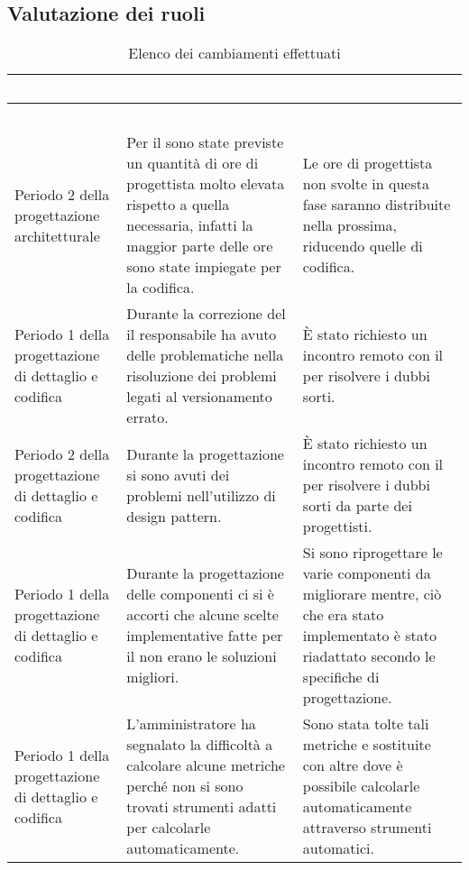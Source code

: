 \subsection{Valutazione dei ruoli}

{
	\renewcommand{\arraystretch}{1.5}
	\centering
	\begin{longtable}{ C{3cm} C{5.5cm} C{5.5cm}}
		\caption{Elenco dei cambiamenti effettuati}\\
		\textcolor{white}{\textbf{Periodo}} & \textcolor{white}{\textbf{Problema}} & \textcolor{white}{\textbf{Soluzione}}\\
		\endfirsthead
		\textcolor{white}{\textbf{Periodo}} & \textcolor{white}{\textbf{Problema}} & \textcolor{white}{\textbf{Soluzione}}\\
		\endhead
		
		Periodo 2 della progettazione architetturale & Per il  sono state previste un quantità di ore di progettista molto elevata rispetto a quella necessaria, infatti la maggior parte delle ore sono state impiegate per la codifica. & Le ore di progettista non svolte in questa fase saranno distribuite nella prossima, riducendo quelle di codifica.\\
		
		Periodo 1 della progettazione di dettaglio e codifica & Durante la correzione del \PdP il responsabile ha avuto delle problematiche nella risoluzione dei problemi legati al versionamento errato. & È stato richiesto un incontro remoto con il \VT{} per risolvere i dubbi sorti.\\
		
		Periodo 2 della progettazione di dettaglio e codifica & Durante la progettazione si sono avuti dei problemi nell'utilizzo di design pattern. & È stato richiesto un incontro remoto con il \CR{} per risolvere i dubbi sorti da parte dei progettisti.\\
		
		Periodo 1 della progettazione di dettaglio e codifica & Durante la progettazione delle componenti ci si è accorti che alcune scelte implementative fatte per il  non erano le soluzioni migliori. & Si sono riprogettare le varie componenti da migliorare mentre, ciò che era stato implementato è stato riadattato secondo le specifiche di progettazione. \\
		
		Periodo 1 della progettazione di dettaglio e codifica & L'amministratore ha segnalato la difficoltà a calcolare alcune metriche perché non si sono trovati strumenti adatti per calcolarle automaticamente. & Sono stata tolte tali metriche e sostituite con altre dove è possibile calcolarle automaticamente attraverso strumenti automatici. \\
		
		
	\end{longtable}
}

